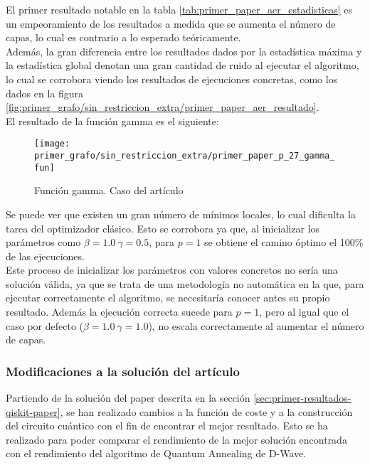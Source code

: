 \documentclass{article}
\begin{document}
El primer resultado notable en la tabla \ref{tab:primer_paper_aer_estadisticas} es un empeoramiento de los resultados a medida que se aumenta el número de capas, lo cual es contrario a lo esperado teóricamente. \\
Además, la gran diferencia entre los resultados dados por la estadística máxima y la estadística global denotan una gran cantidad de ruido al ejecutar el algoritmo, lo cual se corrobora viendo los resultados de ejecuciones concretas, como los dados en la figura \ref{fig:primer_grafo/sin_restriccion_extra/primer_paper_aer_resultado}. \\

El resultado de la función gamma es el siguiente:
\begin{figure}[htbp]
  \centering
  \texttt{[image: primer\_grafo/sin\_restriccion\_extra/primer\_paper\_p\_27\_gamma\_fun]}
  \caption{Función gamma. Caso del artículo}
  \label{fig:primer_grafo/sin_restriccion_extra/primer_paper_p_27_gamma_fun}
\end{figure}

Se puede ver que existen un gran número de mínimos locales, lo cual dificulta la tarea del optimizador clásico. Esto se corrobora ya que, al inicializar los parámetros como \(\beta = 1.0 \ \gamma = 0.5\), para \(p = 1\) se obtiene el camino óptimo el 100\% de las ejecuciones. \\
Este proceso de inicializar los parámetros con valores concretos no sería una solución válida, ya que se trata de una metodología no automática en la que, para ejecutar correctamente el algoritmo, se necesitaría conocer antes su propio resultado. Además la ejecución correcta sucede para \(p = 1\), pero al igual que el caso por defecto (\(\beta = 1.0 \ \gamma = 1.0\)), no escala correctamente al aumentar el número de capas.

\subsubsection{Modificaciones a la solución del artículo}
\label{sec:primer-resultados-qiskit-modificaciones}
Partiendo de la solución del paper descrita en la sección \ref{sec:primer-resultados-qiskit-paper}, se han realizado cambios a la función de coste y a la construcción del circuito cuántico con el fin de encontrar el mejor resultado. Esto se ha realizado para poder comparar el rendimiento de la mejor solución encontrada con el rendimiento del algoritmo de Quantum Annealing de D-Wave.
\end{document}
